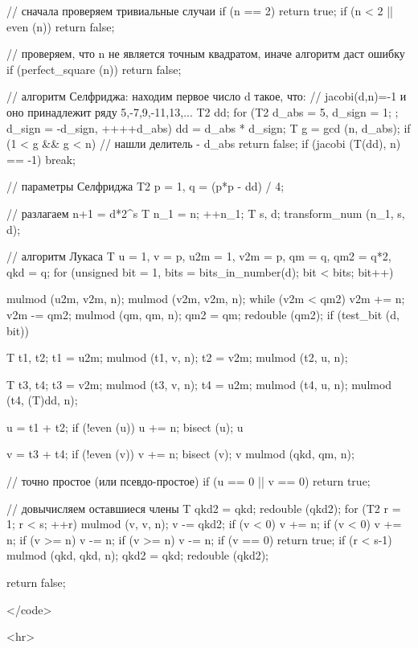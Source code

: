 {

	// сначала проверяем тривиальные случаи
	if (n == 2)
		return true;
	if (n < 2 || even (n))
		return false;

	// проверяем, что n не является точным квадратом, иначе алгоритм даст ошибку
	if (perfect_square (n))
		return false;

	// алгоритм Селфриджа: находим первое число d такое, что:
	// jacobi(d,n)=-1 и оно принадлежит ряду { 5,-7,9,-11,13,... }
	T2 dd;
	for (T2 d_abs = 5, d_sign = 1; ; d_sign = -d_sign, ++++d_abs)
	{
		dd = d_abs * d_sign;
		T g = gcd (n, d_abs);
		if (1 < g && g < n)
			// нашли делитель - d_abs
			return false;
		if (jacobi (T(dd), n) == -1)
			break;
	}

	// параметры Селфриджа
	T2
		p = 1,
		q = (p*p - dd) / 4;
	
	// разлагаем n+1 = d*2^s
	T n_1 = n;
	++n_1;
	T s, d;
	transform_num (n_1, s, d);

	// алгоритм Лукаса
	T
		u = 1,
		v = p,
		u2m = 1,
		v2m = p,
		qm = q,
		qm2 = q*2,
		qkd = q;
	for (unsigned bit = 1, bits = bits_in_number(d); bit < bits; bit++)
	{
		mulmod (u2m, v2m, n);
		mulmod (v2m, v2m, n);
		while (v2m < qm2)
			v2m += n;
		v2m -= qm2;
		mulmod (qm, qm, n);
		qm2 = qm;
		redouble (qm2);
		if (test_bit (d, bit))
		{
			T t1, t2;
			t1 = u2m;
			mulmod (t1, v, n);
			t2 = v2m;
			mulmod (t2, u, n);
			
			T t3, t4;
			t3 = v2m;
			mulmod (t3, v, n);
			t4 = u2m;
			mulmod (t4, u, n);
			mulmod (t4, (T)dd, n);

			u = t1 + t2;
			if (!even (u))
				u += n;
			bisect (u);
			u %

			v = t3 + t4;
			if (!even (v))
				v += n;
			bisect (v);
			v %
			mulmod (qkd, qm, n);
		}
	}

	// точно простое (или псевдо-простое)
	if (u == 0 || v == 0)
		return true;

	// довычисляем оставшиеся члены
	T qkd2 = qkd;
	redouble (qkd2);
	for (T2 r = 1; r < s; ++r)
	{
		mulmod (v, v, n);
		v -= qkd2;
		if (v < 0) v += n;
		if (v < 0) v += n;
		if (v >= n) v -= n;
		if (v >= n) v -= n;
		if (v == 0)
			return true;
		if (r < s-1)
		{
			mulmod (qkd, qkd, n);
			qkd2 = qkd;
			redouble (qkd2);
		}
	}

	return false;

}</code>

<hr>

